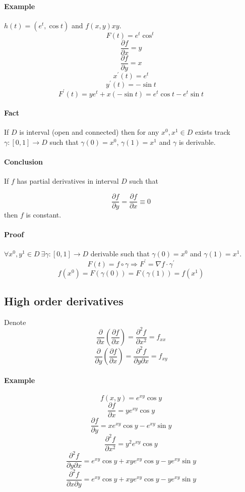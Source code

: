 \paragraph{Example}
$h(t) = (e^t, \cos t)$ and $f(x,y) xy$.
$$F(t) = e^t\cos^t$$
$$\frac{\partial f}{\partial x} = y$$
$$\frac{\partial f}{\partial y} = x$$
$$x^\prime (t) = e^t$$
$$y^\prime (t) = -\sin t$$
$$F^\prime (t) = ye^t + x(-\sin t) = e^t\cos t -e^t \sin t$$
\paragraph{Fact} If $D$ is interval (open and connected) then for any $x^0, x^1 \in D$ exists track $\gamma: [0,1] \to D$ such that $\gamma(0) = x^0$, $\gamma(1) = x^1$ and $\gamma$ is derivable.
\paragraph{Conclusion} If $f$ has  partial derivatives in interval $D$ such that

$$\frac{\partial f}{\partial y} = \frac{\partial f}{\partial x} \equiv 0$$
then $f$ is constant.
\paragraph{Proof}
$\forall x^0, y^1 \in D \: \exists \gamma: [0,1] \to D$ derivable such that $\gamma(0)=x^0$ and $\gamma(1)=x^1$.
$$F(t) = f\circ \gamma \Rightarrow F^\prime = \nabla f \cdot \gamma^\prime$$
$$f(x^0) = F(\gamma(0)) = F(\gamma(1)) = f(x^1)$$
\subsection{High order derivatives}
Denote
$$\frac{\partial }{\partial x} \left( \frac{\partial f}{\partial x} \right) = \frac{\partial^2 f}{\partial x^2} = f_{xx}$$
$$\frac{\partial }{\partial y} \left( \frac{\partial f}{\partial x} \right) = \frac{\partial^2 f}{\partial y \partial x} = f_{xy}$$
\paragraph{Example}
$$f(x,y) = e^{xy}\cos y$$
$$\frac{\partial f}{\partial x} = ye^{xy}\cos y$$
$$\frac{\partial f}{\partial y} = xe^{xy}\cos y - e^{xy}\sin y $$
$$\frac{\partial^2 f}{\partial x^2} = y^2e^{xy}\cos y$$
$$\frac{\partial^2 f}{\partial y\partial x} = e^{xy}\cos y + xye^{xy}\cos y - ye^{xy}\sin y$$
$$\frac{\partial^2 f}{\partial x\partial y} = e^{xy}\cos y + xye^{xy}\cos y - ye^{xy}\sin y$$


